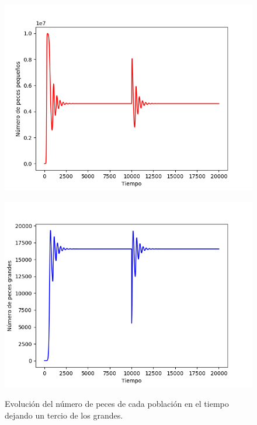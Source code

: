 \documentclass[11pt,a4paper]{report}
\begin{document}
\begin{figure}[H]
\centering
\begin{minipage}{.5\textwidth}
  \centering
  \includegraphics[scale=0.4]{img/peces-p-tercio.png}
  \label{fig:peces-p-tercio}
\end{minipage}%
\begin{minipage}{.5\textwidth}
  \centering
  \includegraphics[scale=0.4]{img/peces-g-tercio.png}
  \label{fig:peces-g-tercio}
\end{minipage}
\caption{Evolución del número de peces de cada población en el tiempo dejando un tercio de los grandes.}
\end{figure}
\end{document}
